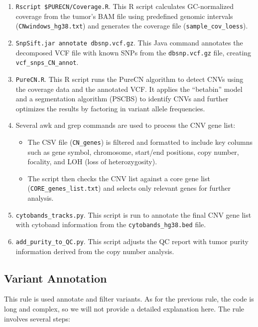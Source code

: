 \begin{enumerate}
    \item \lstinline|Rscript $PURECN/Coverage.R|. This R script calculates GC-normalized coverage from the tumor's BAM file using predefined genomic intervals (\texttt{CNwindows\_hg38.txt}) and generates the coverage file (\texttt{sample\_cov\_loess}). 
    \item \lstinline|SnpSift.jar annotate dbsnp.vcf.gz|. This Java command annotates the decomposed VCF file with known SNPs from the \texttt{dbsnp.vcf.gz} file, creating \texttt{vcf\_snps\_CN\_annot}.
    \item \lstinline|PureCN.R|. This R script runs the PureCN algorithm to detect CNVs using the coverage data and the annotated VCF. It applies the “betabin” model and a segmentation algorithm (PSCBS) to identify CNVs and further optimizes the results by factoring in variant allele frequencies.
    \item Several awk and grep commands are used to process the CNV gene list:
        \begin{itemize}
            \item The CSV file (\texttt{CN\_genes}) is filtered and formatted to include key columns such as gene symbol, chromosome, start/end positions, copy number, focality, and LOH (loss of heterozygosity).
            \item The script then checks the CNV list against a core gene list (\texttt{CORE\_genes\_list.txt}) and selects only relevant genes for further analysis.
        \end{itemize}
    \item \lstinline|cytobands_tracks.py|. This script is run to annotate the final CNV gene list with cytoband information from the \texttt{cytobands\_hg38.bed} file.
    \item \lstinline|add_purity_to_QC.py|. This script adjusts the QC report with tumor purity information derived from the copy number analysis.
\end{enumerate}

\subsection{Variant Annotation}

This rule is used annotate and filter variants. As for the previous rule, the code is long and complex, so we will not provide a detailed explanation here. The rule involves several steps:

